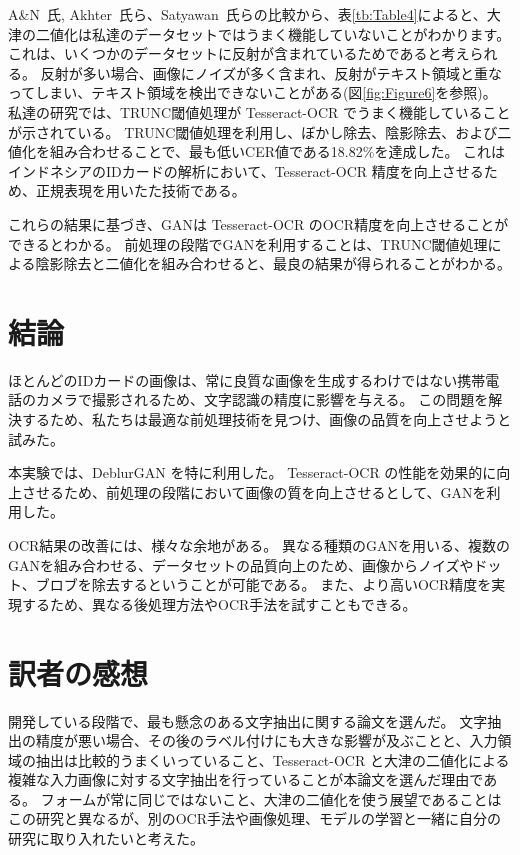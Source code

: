 \documentclass[uplatex, twocolumn,10pt]{jsarticle}
\begin{document}
A\&N~\cite{bib12}氏, Akhter~\cite{bib12}氏ら、Satyawan~\cite{bib4}氏らの比較から、表\ref{tb:Table4}によると、大津の二値化は私達のデータセットではうまく機能していないことがわかります。
これは、いくつかのデータセットに反射が含まれているためであると考えられる。
反射が多い場合、画像にノイズが多く含まれ、反射がテキスト領域と重なってしまい、テキスト領域を検出できないことがある(図\ref{fig:Figure6}を参照)。
私達の研究では、TRUNC閾値処理が Tesseract-OCR でうまく機能していることが示されている。
TRUNC閾値処理を利用し、ぼかし除去、陰影除去、および二値化を組み合わせることで、最も低いCER値である18.82\%を達成した。
これはインドネシアのIDカードの解析において、Tesseract-OCR 精度を向上させるため、正規表現を用いたた技術である。

これらの結果に基づき、GANは Tesseract-OCR のOCR精度を向上させることができるとわかる。
前処理の段階でGANを利用することは、TRUNC閾値処理による陰影除去と二値化を組み合わせると、最良の結果が得られることがわかる。



\section{結論}

ほとんどのIDカードの画像は、常に良質な画像を生成するわけではない携帯電話のカメラで撮影されるため、文字認識の精度に影響を与える。
この問題を解決するため、私たちは最適な前処理技術を見つけ、画像の品質を向上させようと試みた。

本実験では、DeblurGAN を特に利用した。
Tesseract-OCR の性能を効果的に向上させるため、前処理の段階において画像の質を向上させるとして、GANを利用した。

OCR結果の改善には、様々な余地がある。
異なる種類のGANを用いる、複数のGANを組み合わせる、データセットの品質向上のため、画像からノイズやドット、ブロブを除去するということが可能である。
また、より高いOCR精度を実現するため、異なる後処理方法やOCR手法を試すこともできる。




\section{訳者の感想}
開発している段階で、最も懸念のある文字抽出に関する論文を選んだ。
文字抽出の精度が悪い場合、その後のラベル付けにも大きな影響が及ぶことと、入力領域の抽出は比較的うまくいっていること、Tesseract-OCR と大津の二値化による複雑な入力画像に対する文字抽出を行っていることが本論文を選んだ理由である。
フォームが常に同じではないこと、大津の二値化を使う展望であることはこの研究と異なるが、別のOCR手法や画像処理、モデルの学習と一緒に自分の研究に取り入れたいと考えた。
\end{document}
